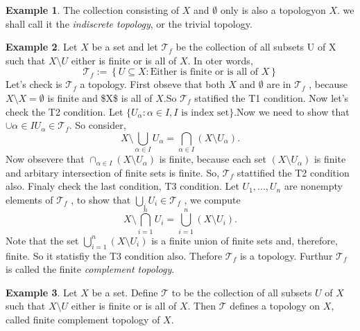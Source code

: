 \documentclass[
]{book}
\theoremstyle{definition}
\theoremstyle{definition}
\newtheorem{example}{Example}[chapter]
\theoremstyle{definition}
\theoremstyle{definition}
\theoremstyle{remark}
\begin{document}
\begin{example}
\protect\hypertarget{exm:unnamed-chunk-5}{}\label{exm:unnamed-chunk-5}The collection consisting of \(X\) and \(\emptyset\) only is also a topologyon \(X\). we shall call it the \emph{indiscrete topology}, or the trivial topology.
\end{example}

\begin{example}
\protect\hypertarget{exm:unnamed-chunk-6}{}\label{exm:unnamed-chunk-6}Let \(X\) be a set and let \(\mathcal{T}_f\) be the collection of all subsets U of X such that \(X\setminus U\) either is finite or is all of \(X\). In oter words,
\[\mathcal{T}_f:=\left\{U\subseteq X : \text{Either is finite or is all of } X\right\}\]
Let's check is \(\mathcal{T}_f\) a topology. First obseve that both \(X\) and \(\emptyset\) are in \(\mathcal{T}_f\) , because \(X\setminus X=\emptyset\) is finite and \$X\setminus \emptyset \$ is all of \(X\).So \(\mathcal{T}_f\) statified the T1 condition. Now let's check the T2 condition. Let \(\{U_{\alpha}:\alpha\in I, I \text{ is index set}\}\).Now we need to show that \(\cup{\alpha\in I} U_\alpha\in \mathcal{T}_f\). So consider,
\[X\setminus \bigcup_{\alpha\in I} U_\alpha =\bigcap_{\alpha\in I} (X\setminus  U_\alpha).\]
Now obsevere that \(\cap_{\alpha\in I} (X\setminus U_\alpha)\) is finite, because each set \((X\setminus U_\alpha)\) is finite and arbitary intersection of finite sets is finite. So, \(\mathcal{T}_f\) stattified the T2 condition also.
Finaly check the last condition, T3 condition. Let \(U_1,...,U_n\) are nonempty elements of \(\mathcal{T}_f\) , to show that \(\bigcup_i U_i \in \mathcal{T}_f\) , we compute
\[X\setminus \bigcap_{i=1}^n U_i = \bigcup_{i=1}^n(X \setminus U_i).\]
Note that the set \(\bigcup_{i=1}^n(X \setminus U_i)\) is a finite union of finite sets and, therefore, finite. So it statisfiy the T3 condition also. Thefore \(\mathcal{T}_f\) is a topology. Furthur \(\mathcal{T}_f\) is called the finite \emph{complement topology}.
\end{example}

\begin{example}
\protect\hypertarget{exm:unnamed-chunk-7}{}\label{exm:unnamed-chunk-7}Let \(X\) be a set. Define \(\mathcal{T}\) to be the collection of all subsets \(U\) of \(X\) such that \(X\setminus U\) either is finite or is all of \(X\). Then \(\mathcal{T}\) defines a topology on \(X\), called finite complement topology of \(X\).
\end{example}
\end{document}
